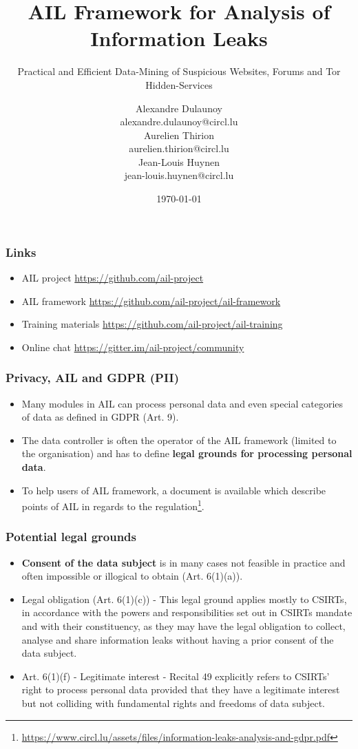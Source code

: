 \documentclass{beamer}
\author{\Large{Alexandre Dulaunoy}\\ \scriptsize{alexandre.dulaunoy@circl.lu}\\ \large{Aurelien Thirion}\\ \scriptsize{aurelien.thirion@circl.lu}\\ \large{Jean-Louis Huynen}\\ \scriptsize{jean-louis.huynen@circl.lu}\\}
\title{AIL Framework for Analysis of Information Leaks}
\subtitle{Practical and Efficient Data-Mining of Suspicious Websites, Forums and Tor Hidden-Services}
\institute{info@circl.lu}
\date{\today}
\begin{document}
\begin{frame}[t,plain]
\titlepage
\end{frame}


\begin{frame}
\frametitle{Links}
    \begin{itemize}
        \item AIL project \url{https://github.com/ail-project}
        \item AIL framework \url{https://github.com/ail-project/ail-framework}
        \item Training materials \url{https://github.com/ail-project/ail-training}
        \item Online chat \url{https://gitter.im/ail-project/community}
    \end{itemize}
\end{frame}


\begin{frame}
        \frametitle{Privacy, AIL and GDPR (PII)}
        \begin{itemize}
                \item Many modules in AIL can process personal data and even special categories of data as defined in GDPR (Art. 9).
                \item The data controller is often the operator of the AIL framework (limited to the organisation) and has to define {\bf legal grounds for processing personal data}.
                \item To help users of AIL framework, a document is available which describe points of AIL in regards to the regulation\footnote{\url{https://www.circl.lu/assets/files/information-leaks-analysis-and-gdpr.pdf}}.
        \end{itemize}
\end{frame}

\begin{frame}
        \frametitle{Potential legal grounds}
        \begin{itemize}
                \item {\bf Consent of the data subject} is in many cases not feasible in practice and often impossible or illogical to obtain (Art. 6(1)(a)).
                \item Legal obligation (Art. 6(1)(c)) - This legal ground applies mostly to CSIRTs, in accordance with the powers and responsibilities set out in CSIRTs mandate and with their constituency, as they may have the legal obligation to collect, analyse and share information leaks without having a prior consent of the data subject.
				\item Art. 6(1)(f) - Legitimate interest - Recital 49 explicitly refers to CSIRTs’ right to process personal data provided that they have a legitimate interest but not colliding with fundamental rights and freedoms of data subject.
        \end{itemize}
\end{frame}
\end{document}
